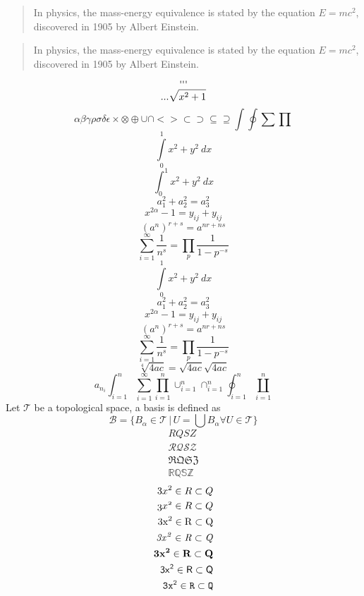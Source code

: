 \begin{quote}
In physics, the mass-energy equivalence is stated 
by the equation $E=mc^2$, discovered in 1905 by Albert Einstein.
\end{quote}
\begin{quote}
In physics, the mass-energy equivalence is stated 
by the equation \begin{math}E=mc^2\end{math}, discovered in 1905 by Albert Einstein.
\end{quote}
\[...\]
\begin{displaymath}
...
\end{displaymath}
\begin{equation}
... \\
\sqrt{x^2+1}
\end{equation}
\newline
\[
\alpha \beta \gamma \rho \sigma \delta \epsilon
\times \otimes \oplus \cup \cap
< > \subset \supset \subseteq \supseteq
\int \oint \sum \prod
\]
\newline
\[ \int\limits_0^1 x^2 + y^2 \ dx \]
\[ \int_0^1 x^2 + y^2 \ dx \]
\[ a_1^2 + a_2^2 = a_3^2 \]
\[ x^{2 \alpha} - 1 = y_{ij} + y_{ij}  \]
\[ (a^n)^{r+s} = a^{nr+ns}  \]
\[ \sum_{i=1}^{\infty} \frac{1}{n^s} 
= \prod_p \frac{1}{1 - p^{-s}} \]
\[ \int\limits_0^1 x^2 + y^2 \ dx \]
\vspace{1cm}
\[ a_1^2 + a_2^2 = a_3^2 \]
\vspace{1cm}
\[ x^{2 \alpha} - 1 = y_{ij} + y_{ij}  \]
\vspace{1cm}
\[ (a^n)^{r+s} = a^{nr+ns} \]
\vspace{1cm}
\[ \sum_{i=1}^{\infty} \frac{1}{n^s} = \prod_p \frac{1}{1 - p^{-s}} \]
\vspace{1cm}
\[ \sqrt[4]{4ac} = \sqrt{4ac}\sqrt{4ac} \]
\[
a_{n_i}
\int_{i=1}^n
\sum_{i=1}^{\infty}
\prod_{i=1}^n
\cup_{i=1}^n
\cap_{i=1}^n
\oint_{i=1}^n
\coprod_{i=1}^n
\]
Let \( \mathcal{T} \) be a topological space, a basis is defined as
\[
 \mathcal{B} = \{B_{\alpha} \in \mathcal{T}\, |\,  U = \bigcup B_{\alpha} \forall U \in \mathcal{T} \}
\]
\begin{align*}
RQSZ \\
\mathcal{RQSZ} \\
\mathfrak{RQSZ} \\
\mathbb{RQSZ}
\end{align*}
\begin{align*}
3x^2 \in R \subset Q \\
\mathnormal{3x^2 \in R \subset Q} \\
\mathrm{3x^2 \in R \subset Q} \\
\mathit{3x^2 \in R \subset Q} \\
\mathbf{3x^2 \in R \subset Q} \\
\mathsf{3x^2 \in R \subset Q} \\
\mathtt{3x^2 \in R \subset Q}
\end{align*}
